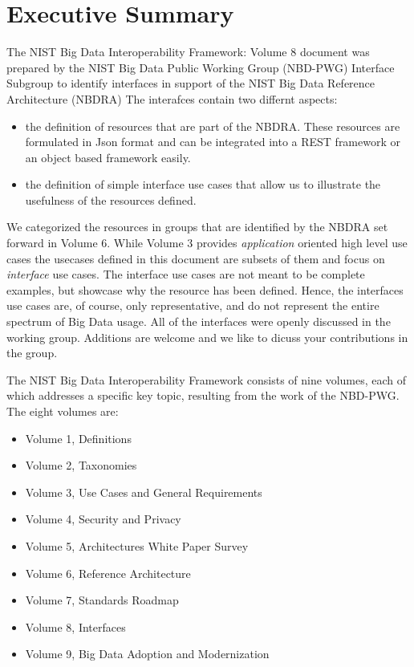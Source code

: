 \section*{Executive Summary}

The NIST Big Data Interoperability Framework: Volume 8 document
\cite{nist-vol-6} was prepared by the NIST Big Data Public Working
Group (NBD-PWG) Interface Subgroup to identify interfaces in support
of the NIST Big Data Reference Architecture (NBDRA) The interafces
contain two differnt aspects:

\begin{itemize}

\item the definition of resources that are part of the NBDRA. These
  resources are formulated in Json format and can be integrated into a
  REST framework or an object based framework easily.

\item the definition of simple interface use cases that allow us to
  illustrate the usefulness of the resources defined.

\end{itemize} 

We categorized the resources in groups that are identified by the
NBDRA set forward in Volume 6. While Volume 3 provides {\it
  application} oriented high level use cases the usecases defined in
this document are subsets of them and focus on {\it interface} use
cases. The interface use cases are not meant to be complete examples,
but showcase why the resource has been defined. Hence, the interfaces
use cases are, of course, only representative, and do not represent
the entire spectrum of Big Data usage. All of the interfaces were
openly discussed in the working group. Additions are welcome and we
like to dicuss your contributions in the group.

The NIST Big Data Interoperability Framework consists of nine
volumes, each of which addresses a specific key topic, resulting from
the work of the NBD-PWG. The eight volumes are:

\begin{itemize}
\item Volume 1, Definitions
\item Volume 2, Taxonomies
\item Volume 3, Use Cases and General Requirements
\item Volume 4, Security and Privacy
\item Volume 5, Architectures White Paper Survey
\item Volume 6, Reference Architecture
\item Volume 7, Standards Roadmap
\item Volume 8, Interfaces
\item Volume 9, Big Data Adoption and Modernization
\end{itemize}

